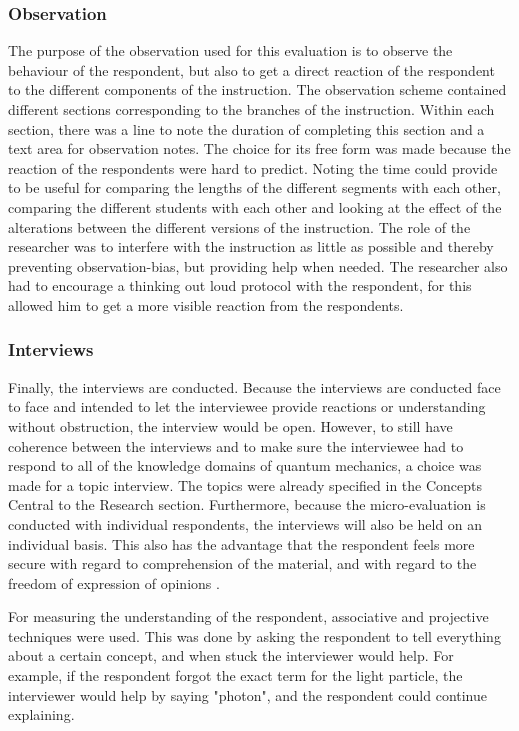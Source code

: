 \documentclass[11pt,twoside]{report} %
\begin{document}
\subsubsection{Observation}

The purpose of the observation used for this evaluation is to observe the behaviour of the respondent, but also to get a direct reaction of the respondent to the different components of the instruction. The observation scheme contained different sections corresponding to the branches of the instruction. Within each section, there was a line to note the duration of completing this section and a text area for observation notes. The choice for its free form was made because the reaction of the respondents were hard to predict. Noting the time could provide to be useful for comparing the lengths of the different segments with each other, comparing the different students with each other and looking at the effect of the alterations between the different versions of the instruction. The role of the researcher was to interfere with the instruction as little as possible and thereby preventing observation-bias, but providing help when needed. The researcher also had to encourage a thinking out loud protocol with the respondent, for this allowed him to get a more visible reaction from the respondents.

\subsubsection{Interviews}

Finally, the interviews are conducted. Because the interviews are conducted face to face and intended to let the interviewee provide reactions or understanding without obstruction, the interview would be open. However, to still have coherence between the interviews and to make sure the interviewee had to respond to all of the knowledge domains of quantum mechanics, a choice was made for a topic interview. The topics were already specified in the Concepts Central to the Research section. Furthermore, because the micro-evaluation is conducted with individual respondents, the interviews will also be held on an individual basis. This also has the advantage that the respondent feels more secure with regard to comprehension of the material, and with regard to the freedom of expression of opinions \cite{kwalitatief}.

For measuring the understanding of the respondent, associative and projective techniques were used. This was done by asking the respondent to tell everything about a certain concept, and when stuck the interviewer would help. For example, if the respondent forgot the exact term for the light particle, the interviewer would help by saying "photon", and the respondent could continue explaining.
\end{document}
